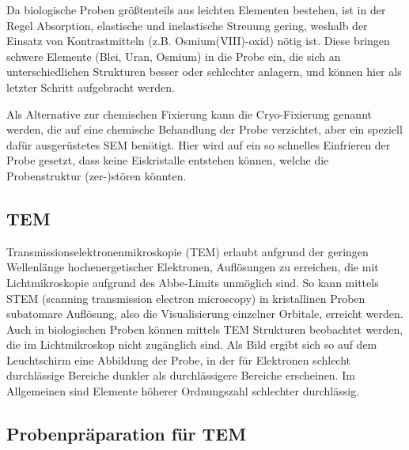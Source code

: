 Da biologische Proben größtenteils aus leichten Elementen bestehen, ist in der Regel Absorption, elastische und inelastische Streuung gering, weshalb der Einsatz von Kontrastmitteln (z.B. Osmium(VIII)-oxid) nötig ist.
Diese bringen schwere Elemente (Blei, Uran, Osmium) in die Probe ein, die sich an unterschiedlichen Strukturen besser oder schlechter anlagern, und können hier als letzter Schritt aufgebracht werden.

Als Alternative zur chemischen Fixierung kann die Cryo-Fixierung genannt werden, die auf eine chemische Behandlung der Probe verzichtet, aber ein speziell dafür ausgerüstetes SEM benötigt.
Hier wird auf ein so schnelles Einfrieren der Probe gesetzt, dass keine Eiskristalle entstehen können, welche die Probenstruktur (zer-)stören könnten.





\subsection{TEM}

Transmissionselektronenmikroskopie (TEM) erlaubt aufgrund der geringen Wellenlänge hochenergetischer Elektronen, Auflösungen zu erreichen, die mit Lichtmikroskopie aufgrund des Abbe-Limits unmöglich sind.
So kann mittels STEM (scanning transmission electron microscopy) in kristallinen Proben subatomare Auflösung, also die Visualisierung einzelner Orbitale, erreicht werden.
Auch in biologischen Proben können mittels TEM Strukturen beobachtet werden, die im Lichtmikroskop nicht zugänglich sind.
Als Bild ergibt sich so auf dem Leuchtschirm eine Abbildung der Probe, in der für Elektronen schlecht durchlässige Bereiche dunkler als durchlässigere Bereiche erscheinen.
Im Allgemeinen sind Elemente höherer Ordnungszahl schlechter durchlässig.

\subsection{Probenpräparation für TEM}

